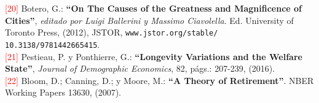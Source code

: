 \vspace{-0.23cm}
\noindent \textcolor{red}{[20]} Botero, G.: \textbf{``On The Causes of the Greatness and Magnificence of Cities''}, \textit{editado por Luigi Ballerini y Massimo Ciavolella}. Ed. University of Toronto Press, (2012), JSTOR, \texttt{www.jstor.org/stable/\\10.3138/9781442665415}. \\

\vspace{-0.23cm}
\noindent \textcolor{red}{[21]} Pestieau, P. y Ponthierre, G.: \textbf{``Longevity Variations and the Welfare State''}, \textit{Journal of Demographic Economics}, 82, págs.: 207-239, (2016). \\

\vspace{-0.23cm}
\noindent \textcolor{red}{[22]} Bloom, D.; Canning, D.; y Moore, M.: \textbf{``A Theory of Retirement''}. NBER Working Papers 13630, (2007).\\




